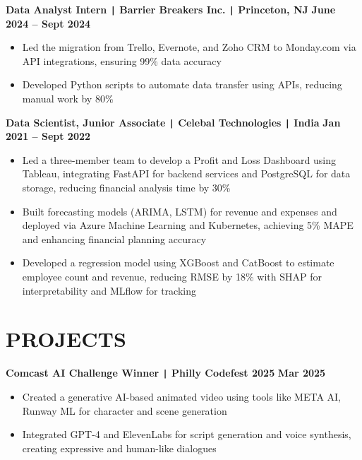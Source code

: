 \documentclass[10pt]{article}
\begin{document}
\vspace{-0.2cm}
\noindent
\textbf{Data Analyst Intern \texttt{|} Barrier Breakers Inc. \texttt{|} Princeton, NJ} \hfill \textbf{June 2024 -- Sept 2024} 
\vspace{-0.15cm}
\begin{itemize}[leftmargin=0.5cm, itemsep=0pt]

    \item Led the migration from Trello, Evernote, and Zoho CRM to Monday.com via API integrations, ensuring 99\% data accuracy

    \item Developed Python scripts to automate data transfer using APIs, reducing manual work by 80\%

\end{itemize}

\vspace{-0.2cm}
\noindent
\textbf{Data Scientist, Junior Associate \texttt{|} Celebal Technologies \texttt{|} India} \hfill \textbf{Jan 2021 -- Sept 2022} 
\vspace{-0.15cm}
\begin{itemize}[leftmargin=0.5cm, itemsep=0pt]

    \item Led a three-member team to develop a Profit and Loss Dashboard using Tableau, integrating FastAPI for backend services and PostgreSQL for data storage, reducing financial analysis time by 30\%

    \item Built forecasting models (ARIMA, LSTM) for revenue and expenses and deployed via Azure Machine Learning and Kubernetes, achieving 5\% MAPE and enhancing financial planning accuracy

    \item Developed a regression model using XGBoost and CatBoost to estimate employee count and revenue, reducing RMSE by 18\% with SHAP for interpretability and MLflow for tracking

\end{itemize}


\vspace{-0.75cm}
\section*{PROJECTS}
\vspace{-0.1cm}

\noindent
\textbf{Comcast AI Challenge Winner \texttt{|} Philly Codefest 2025} \hfill \textbf{Mar 2025} \\
\vspace{-0.4cm}
\begin{itemize}[leftmargin=0.6cm, itemsep=-0.1cm, topsep=0cm]

    \item Created a generative AI-based animated video using tools like META AI, Runway ML for character and scene generation

    \item Integrated GPT-4 and ElevenLabs for script generation and voice synthesis, creating expressive and human-like dialogues

\end{itemize}
\end{document}
